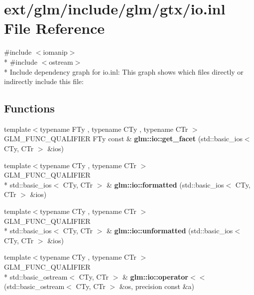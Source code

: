 \hypertarget{io_8inl}{\section{ext/glm/include/glm/gtx/io.inl File Reference}
\label{io_8inl}
}
{\ttfamily \#include $<$iomanip$>$}\\*
{\ttfamily \#include $<$ostream$>$}\\*
Include dependency graph for io.\-inl\-:
This graph shows which files directly or indirectly include this file\-:
\subsection*{Functions}
\begin{DoxyCompactItemize}
\item 
\hypertarget{namespaceglm_1_1io_a9e8927cf032254b0eee4ec650286e1f9}{{\footnotesize template$<$typename F\-Ty , typename C\-Ty , typename C\-Tr $>$ }\\G\-L\-M\-\_\-\-F\-U\-N\-C\-\_\-\-Q\-U\-A\-L\-I\-F\-I\-E\-R F\-Ty const \& {\bfseries glm\-::io\-::get\-\_\-facet} (std\-::basic\-\_\-ios$<$ C\-Ty, C\-Tr $>$ \&ios)}\label{namespaceglm_1_1io_a9e8927cf032254b0eee4ec650286e1f9}

\item 
\hypertarget{namespaceglm_1_1io_a61bbd0ea648623b0b07215a986bd5aa5}{{\footnotesize template$<$typename C\-Ty , typename C\-Tr $>$ }\\G\-L\-M\-\_\-\-F\-U\-N\-C\-\_\-\-Q\-U\-A\-L\-I\-F\-I\-E\-R \\*
std\-::basic\-\_\-ios$<$ C\-Ty, C\-Tr $>$ \& {\bfseries glm\-::io\-::formatted} (std\-::basic\-\_\-ios$<$ C\-Ty, C\-Tr $>$ \&ios)}\label{namespaceglm_1_1io_a61bbd0ea648623b0b07215a986bd5aa5}

\item 
\hypertarget{namespaceglm_1_1io_a833a8c96b3d84f7aa76e0c3e6845503e}{{\footnotesize template$<$typename C\-Ty , typename C\-Tr $>$ }\\G\-L\-M\-\_\-\-F\-U\-N\-C\-\_\-\-Q\-U\-A\-L\-I\-F\-I\-E\-R \\*
std\-::basic\-\_\-ios$<$ C\-Ty, C\-Tr $>$ \& {\bfseries glm\-::io\-::unformatted} (std\-::basic\-\_\-ios$<$ C\-Ty, C\-Tr $>$ \&ios)}\label{namespaceglm_1_1io_a833a8c96b3d84f7aa76e0c3e6845503e}

\item 
\hypertarget{namespaceglm_1_1io_ac52a8c5f8ea189f5bae2e5b8e382675f}{{\footnotesize template$<$typename C\-Ty , typename C\-Tr $>$ }\\G\-L\-M\-\_\-\-F\-U\-N\-C\-\_\-\-Q\-U\-A\-L\-I\-F\-I\-E\-R \\*
std\-::basic\-\_\-ostream$<$ C\-Ty, C\-Tr $>$ \& {\bfseries glm\-::io\-::operator$<$$<$} (std\-::basic\-\_\-ostream$<$ C\-Ty, C\-Tr $>$ \&os, precision const \&a)}\label{namespaceglm_1_1io_ac52a8c5f8ea189f5bae2e5b8e382675f}


\end{DoxyCompactItemize}
